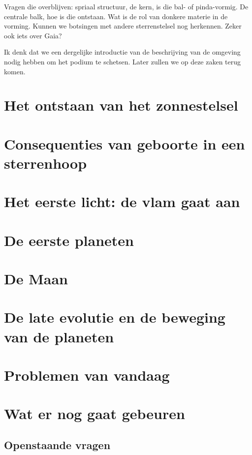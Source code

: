 \documentclass[11pt,fleqn]{book} %
\begin{document}
Vragen die overblijven: spriaal structuur, de kern, is die bal- of
pinda-vormig. De centrale balk, hoe is die ontstaan. Wat is de rol van
donkere materie in de vorming. Kunnen we botsingen met andere
sterrenstelsel nog herkennen. Zeker ook iets over Gaia?

Ik denk dat we een dergelijke introductie van de beschrijving van de
omgeving nodig hebben om het podium te schetsen. Later zullen we op
deze zaken terug komen.


\chapter{Het ontstaan van het zonnestelsel}
\chapter{Consequenties van geboorte in een sterrenhoop}
\chapter{Het eerste licht: de vlam gaat aan}
\chapter{De eerste planeten}
\chapter{De Maan}
\chapter{De late evolutie en de beweging van de planeten}
\chapter{Problemen van vandaag}
\chapter{Wat er nog gaat gebeuren}

\section{Openstaande vragen}
\end{document}
